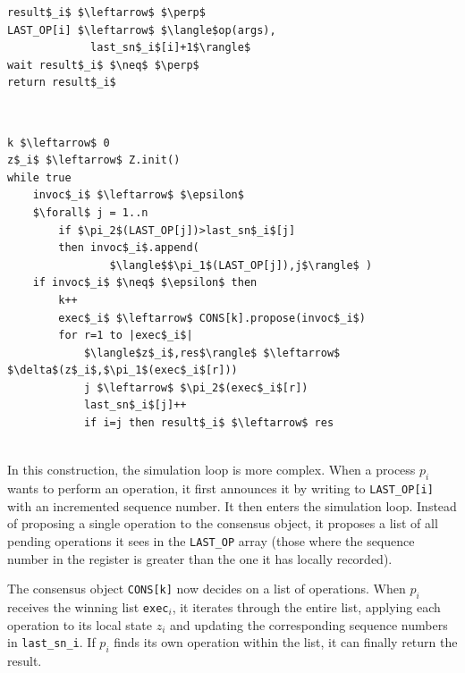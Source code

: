 \begin{minipage}{\textwidth}
\begin{lstlisting}[mathescape]
result$_i$ $\leftarrow$ $\perp$
LAST_OP[i] $\leftarrow$ $\langle$op(args),
             last_sn$_i$[i]+1$\rangle$
wait result$_i$ $\neq$ $\perp$
return result$_i$
\end{lstlisting}
\end{minipage}\\

\begin{minipage}{\textwidth}
\begin{lstlisting}[mathescape]
k $\leftarrow$ 0
z$_i$ $\leftarrow$ Z.init()
while true
    invoc$_i$ $\leftarrow$ $\epsilon$
    $\forall$ j = 1..n
        if $\pi_2$(LAST_OP[j])>last_sn$_i$[j]
        then invoc$_i$.append(
                $\langle$$\pi_1$(LAST_OP[j]),j$\rangle$ )
    if invoc$_i$ $\neq$ $\epsilon$ then
        k++
        exec$_i$ $\leftarrow$ CONS[k].propose(invoc$_i$)
        for r=1 to |exec$_i$|
            $\langle$z$_i$,res$\rangle$ $\leftarrow$ $\delta$(z$_i$,$\pi_1$(exec$_i$[r]))
            j $\leftarrow$ $\pi_2$(exec$_i$[r])
            last_sn$_i$[j]++
            if i=j then result$_i$ $\leftarrow$ res
\end{lstlisting}
\end{minipage}\\

In this construction, the simulation loop is more complex. When a process $p_i$ wants to perform an operation, it first announces it by writing to \texttt{LAST\_OP[i]} with an incremented sequence number. It then enters the simulation loop. Instead of proposing a single operation to the consensus object, it proposes a list of all pending operations it sees in the \texttt{LAST\_OP} array (those where the sequence number in the register is greater than the one it has locally recorded).

The consensus object \texttt{CONS[k]} now decides on a list of operations. When $p_i$ receives the winning list \texttt{exec}$_i$, it iterates through the entire list, applying each operation to its local state $z_i$ and updating the corresponding sequence numbers in \texttt{last\_sn\_i}. If $p_i$ finds its own operation within the list, it can finally return the result.

